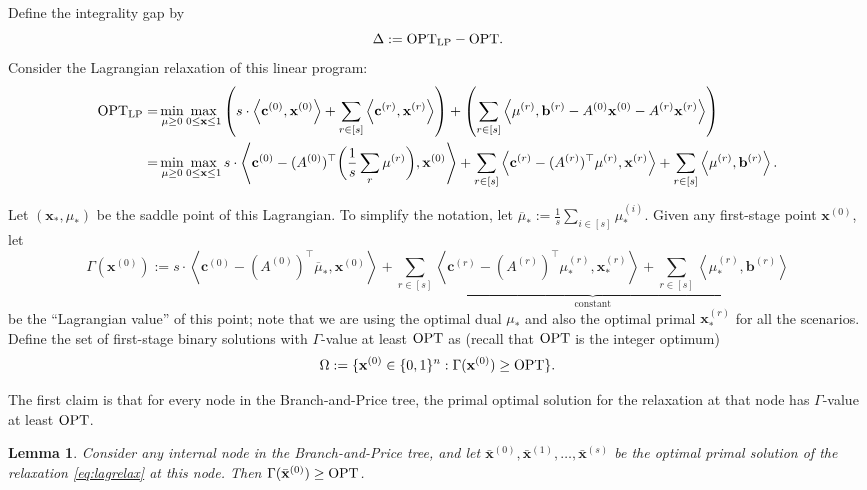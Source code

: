 \documentclass{article}
\newcommand{\cv}[0]{\mathbf{c}}
\newcommand{\xv}[0]{\mathbf{x}}
\newcommand{\bv}[0]{\mathbf{b}}
\newtheorem{lemma}{Lemma}[section]
\newcommand{\iprod}[2]{\left\langle {#1}, {#2} \right\rangle}
\newcommand{\OPT}{\textup{OPT}}
\begin{document}
Define the integrality gap by
$$\Delta := \OPT_{\text{LP}} - \OPT.$$
Consider the Lagrangian relaxation of this linear program:
\begin{align}
   \OPT_{\text{LP}} = & \min_{\mu \geq 0} \max_{0 \leq \xv \leq 1} \left(s \cdot \iprod{\cv^{(0)}}{\xv^{(0)}} + \sum_{r \in [s]} \iprod{\cv^{(r)}}{\xv^{(r)}}\right) + \left( \sum_{r \in [s]} \iprod{\mu^{(r)}}{\bv^{(r)} - A^{(0)} \xv^{(0)} - A^{(r)} \xv^{(r)}} \right) \label{eq:lag} \\
    = & \min_{\mu \geq 0} \max_{0 \leq \xv \leq 1} s \cdot \iprod{\cv^{(0)} - (A^{(0)})^{\top} \bigg(\frac{1}{s} \sum_r \mu^{(r)}\bigg)}{\xv^{(0)}} + \sum_{r \in [s]} \iprod{\cv^{(r)} - (A^{(r)})^{\top} \mu^{(r)}}{\xv^{(r)}} + \sum_{r \in [s]} \iprod{\mu^{(r)}}{\bv^{(r)}}. \notag
\end{align}

Let $(\xv_*,\mu_*)$ be the saddle point of this Lagrangian. To simplify the notation, let $\overline{\mu}_* := \frac{1}{s} \sum_{i \in [s]} \mu^{(i)}_*$. Given any first-stage point $\xv^{(0)}$, let
$$\Gamma(\xv^{(0)}) := s \cdot \iprod{\cv^{(0)} - (A^{(0)})^{\top} \overline{\mu}_*}{\xv^{(0)}} + \underbrace{\sum_{r \in [s]} \iprod{\cv^{(r)} - (A^{(r)})^{\top} \mu_*^{(r)}}{\xv^{(r)}_*} + \sum_{r \in [s]} \iprod{\mu_*^{(r)}}{\bv^{(r)}}}_{\text{constant}}$$
be the ``Lagrangian value'' of this point; note that we are using the optimal dual $\mu_*$ and also the optimal primal $\xv^{(r)}_*$ for all the scenarios. Define the set of first-stage binary solutions with $\Gamma$-value at least $\OPT$ as (recall that $\OPT$ is the integer optimum)
\begin{align*}
    \Omega := \{ \xv^{(0)} \in \{0,1\}^n : \Gamma(\xv^{(0)}) \ge \OPT\}.
\end{align*}

The first claim is that for every node in the Branch-and-Price tree, the primal optimal solution for the relaxation at that node has $\Gamma$-value at least $\OPT$.

\begin{lemma} \label{lemma:bestBound}
    Consider any internal node in the Branch-and-Price tree, and let $\bar{\xv}^{(0)},\bar{\xv}^{(1)},\ldots,\bar{\xv}^{(s)}$ be the optimal primal solution of the relaxation \eqref{eq:lagrelax} at this node. Then $\Gamma(\bar{\xv}^{(0)}) \ge \OPT$.
\end{lemma}
\end{document}

